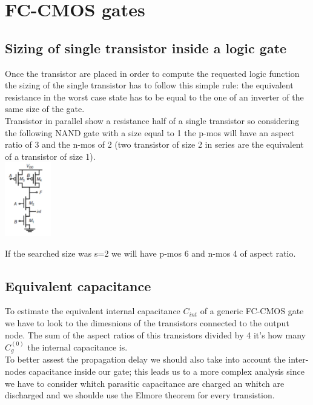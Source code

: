 \chapter{FC-CMOS gates}

\section{Sizing of single transistor inside a logic gate}
Once the transistor are placed in order to compute the requested logic function the sizing of the single transistor has to follow this simple rule: the equivalent resistance in the worst case state has to be equal to the one of an inverter of the same size of the gate.\\
Transistor in parallel show a resistance half of a single transistor so considering the following NAND gate with a size equal to 1 the p-mos will have an aspect ratio of 3 and the n-mos of 2 (two transistor of size 2 in series are the equivalent of a transistor of size 1).\\

\centering
\includegraphics[width=0.15\textwidth]{C6_1.png}\\
\raggedright

If the searched size was s=2 we will have p-mos 6 and n-mos 4 of aspect ratio.\\

\section{Equivalent capacitance}
To estimate the equivalent internal capacitance $C_{int}$ of a generic FC-CMOS gate we have to look to the dimesnions of the transistors connected to the output node. The sum of the aspect ratios of this transistors divided by 4 it's how many $C_g^{(0)}$ the internal capacitance is.\\
\vspace{5mm}
To better assest the propagation delay we should also take into account the inter-nodes capacitance inside our gate; this leads us to a more complex analysis since we have to consider whitch parasitic capacitance are charged an whitch are discharged and we shoulde use the Elmore theorem for every transistion.

